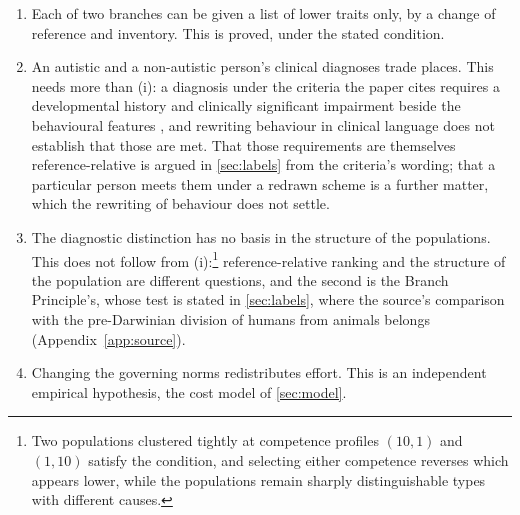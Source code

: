 \begin{enumerate}[label=(\roman*), leftmargin=*, nosep]
\item Each of two branches can be given a list of lower traits only, by a change of reference and inventory. This is proved, under the stated condition.
\item An autistic and a non-autistic person's clinical diagnoses trade places. This needs more than (i): a diagnosis under the criteria the paper cites requires a developmental history and clinically significant impairment beside the behavioural features \cite{APA2013}, and rewriting behaviour in clinical language does not establish that those are met. That those requirements are themselves reference-relative is argued in \autoref{sec:labels} from the criteria's wording; that a particular person meets them under a redrawn scheme is a further matter, which the rewriting of behaviour does not settle.
\item The diagnostic distinction has no basis in the structure of the populations. This does not follow from (i):\footnote{Two populations clustered tightly at competence profiles $(10, 1)$ and $(1, 10)$ satisfy the condition, and selecting either competence reverses which appears lower, while the populations remain sharply distinguishable types with different causes.} reference-relative ranking and the structure of the population are different questions, and the second is the Branch Principle's, whose test is stated in \autoref{sec:labels}, where the source's comparison with the pre-Darwinian division of humans from animals belongs (Appendix~\ref{app:source}).
\item Changing the governing norms redistributes effort. This is an independent empirical hypothesis, the cost model of \autoref{sec:model}.
\end{enumerate}

